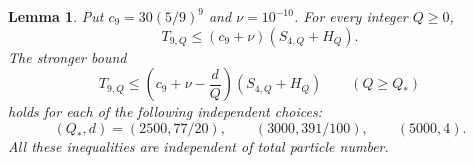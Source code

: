\documentclass[11pt]{article}
\newtheorem{lemma}{Lemma}
\begin{document}
\begin{lemma}\label{lem:optimized-tail}
Put $c_9=30(5/9)^9$ and $\nu=10^{-10}$. For every integer $Q\ge0$,
\begin{equation}\label{eq:optimized-tail-all-Q}
 T_{9,Q}\le(c_9+\nu)(S_{4,Q}+H_Q).
\end{equation}
The stronger bound
\begin{equation}\label{eq:optimized-tail-improvement}
 T_{9,Q}\le\left(c_9+\nu-\frac dQ\right)(S_{4,Q}+H_Q)
 \qquad(Q\ge Q_*)
\end{equation}
holds for each of the following independent choices:
\begin{equation}\label{eq:optimized-tail-choices}
 (Q_*,d)=(2500,77/20),\qquad(3000,391/100),\qquad(5000,4).
\end{equation}
All these inequalities are independent of total particle number.
\end{lemma}
\end{document}
